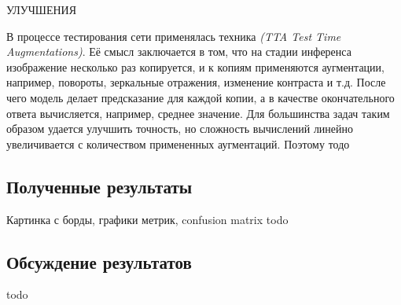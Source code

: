 УЛУЧШЕНИЯ

В процессе тестирования сети применялась техника 
\textit{(TTA Test Time Augmentations)}. Её смысл заключается в том, что на
стадии инференса изображение несколько раз копируется, и к копиям 
применяются аугментации, например, повороты, зеркальные отражения,
изменение контраста и т.д. После чего модель делает предсказание для каждой
копии, а в качестве окончательного ответа вычисляется, например, среднее значение.
Для большинства задач таким образом удается улучшить точность, но сложность
вычислений линейно увеличивается с количеством примененных аугментаций.
Поэтому тодо


\subsection{Полученные результаты}
Картинка с борды, графики метрик, confusion matrix todo



\subsection{Обсуждение результатов}
todo

